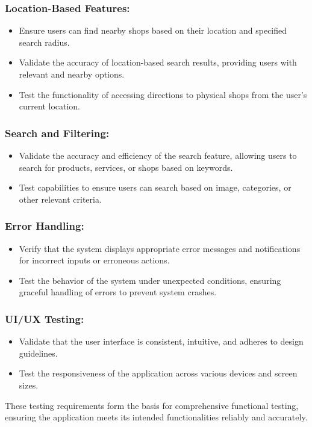 \subsubsection{Location-Based Features:}
	\begin{itemize}
		\item Ensure users can find nearby shops based on their location and specified search radius.
		\item Validate the accuracy of location-based search results, providing users with relevant and nearby options.
		\item Test the functionality of accessing directions to physical shops from the user's current location.
	\end{itemize}
	
\subsubsection{Search and Filtering:}
	\begin{itemize}
		\item Validate the accuracy and efficiency of the search feature, allowing users to search for products, services, or shops based on keywords.
		\item Test capabilities to ensure users can search based on image, categories, or other relevant criteria.
	\end{itemize}
	
\subsubsection{Error Handling:}
	\begin{itemize}
		\item Verify that the system displays appropriate error messages and notifications for incorrect inputs or erroneous actions.
		\item Test the behavior of the system under unexpected conditions, ensuring graceful handling of errors to prevent system crashes.
	\end{itemize}
	
\subsubsection{UI/UX Testing:}
	\begin{itemize}
		\item Validate that the user interface is consistent, intuitive, and adheres to design guidelines.
		\item Test the responsiveness of the application across various devices and screen sizes.
	\end{itemize}

These testing requirements form the basis for comprehensive functional testing, ensuring the application meets its intended functionalities reliably and accurately.












